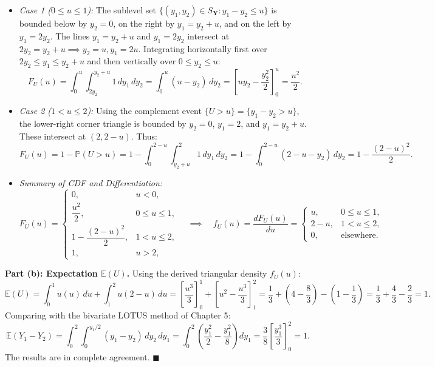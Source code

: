 \documentclass[11pt, letterpaper]{article}
\theoremstyle{definition}
\theoremstyle{remark}
\newcommand{\E}{\mathbb{E}}
\newcommand{\Prob}{\mathbb{P}}
\begin{document}
\begin{itemize}
    \item \textit{Case 1 ($0 \le u \le 1$):} The sublevel set $\{ (y_1, y_2) \in S_{\mathbf{Y}} : y_1 - y_2 \le u \}$ is bounded below by $y_2 = 0$, on the right by $y_1 = y_2 + u$, and on the left by $y_1 = 2y_2$. The lines $y_1 = y_2 + u$ and $y_1 = 2y_2$ intersect at $2y_2 = y_2 + u \implies y_2 = u, y_1 = 2u$. Integrating horizontally first over $2y_2 \le y_1 \le y_2 + u$ and then vertically over $0 \le y_2 \le u$:
    \[
        F_U(u) = \int_{0}^{u} \int_{2y_2}^{y_2 + u} 1\,dy_1\,dy_2 = \int_{0}^{u} (u - y_2)\,dy_2 = \left[ uy_2 - \frac{y_2^2}{2} \right]_{0}^{u} = \frac{u^2}{2}.
    \]
    \item \textit{Case 2 ($1 < u \le 2$):} Using the complement event $\{U > u\} = \{y_1 - y_2 > u\}$, the lower-right corner triangle is bounded by $y_2 = 0$, $y_1 = 2$, and $y_1 = y_2 + u$. These intersect at $(2, 2 - u)$. Thus:
    \[
        F_U(u) = 1 - \Prob(U > u) = 1 - \int_{0}^{2 - u} \int_{y_2 + u}^{2} 1\,dy_1\,dy_2 = 1 - \int_{0}^{2 - u} (2 - u - y_2)\,dy_2 = 1 - \frac{(2 - u)^2}{2}.
    \]
    \item \textit{Summary of CDF and Differentiation:}
    \[
        F_U(u) = \begin{cases} 0, & u < 0, \\ \dfrac{u^2}{2}, & 0 \le u \le 1, \\[6pt] 1 - \dfrac{(2 - u)^2}{2}, & 1 < u \le 2, \\[6pt] 1, & u > 2, \end{cases} \quad \implies \quad f_U(u) = \frac{dF_U(u)}{du} = \begin{cases} u, & 0 \le u \le 1, \\ 2 - u, & 1 < u \le 2, \\ 0, & \text{elsewhere.} \end{cases}
    \]
\end{itemize}

\textbf{Part (b): Expectation $\E(U)$.}
Using the derived triangular density $f_U(u)$:
\[
    \E(U) = \int_{0}^{1} u(u)\,du + \int_{1}^{2} u(2 - u)\,du = \left[ \frac{u^3}{3} \right]_{0}^{1} + \left[ u^2 - \frac{u^3}{3} \right]_{1}^{2} = \frac{1}{3} + \left(4 - \frac{8}{3}\right) - \left(1 - \frac{1}{3}\right) = \frac{1}{3} + \frac{4}{3} - \frac{2}{3} = 1.
\]
Comparing with the bivariate LOTUS method of Chapter 5:
\[
    \E(Y_1 - Y_2) = \int_{0}^{2} \int_{0}^{y_1/2} (y_1 - y_2)\,dy_2\,dy_1 = \int_{0}^{2} \left(\frac{y_1^2}{2} - \frac{y_1^2}{8}\right) dy_1 = \frac{3}{8} \left[\frac{y_1^3}{3}\right]_{0}^{2} = 1.
\]
The results are in complete agreement. \hfill $\blacksquare$
\end{document}

